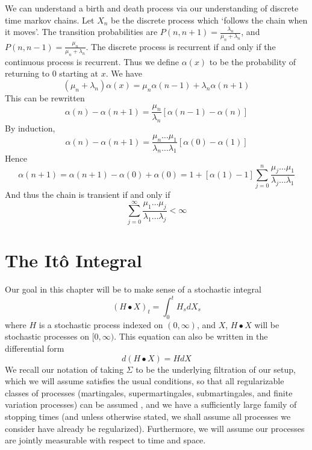 We can understand a birth and death process via our understanding of discrete time markov chains. Let $X_n$ be the discrete process which `follows the chain when it moves'. The transition probabilities are $P(n,n+1) = \frac{\lambda_n}{\mu_n + \lambda_n}$, and $P(n,n-1) = \frac{\mu_n}{\mu_n + \lambda_n}$. The discrete process is recurrent if and only if the continuous process is recurrent. Thus we define $\alpha(x)$ to be the probability of returning to 0 starting at $x$. We have
%
\[ (\mu_n + \lambda_n) \alpha(x) = \mu_n \alpha(n-1) + \lambda_n \alpha(n+1) \]
%
This can be rewritten
%
\[ \alpha(n) - \alpha(n+1) = \frac{\mu_n}{\lambda_n} [\alpha(n-1) - \alpha(n)] \]
%
By induction,
%
\[ \alpha(n) - \alpha(n+1) = \frac{\mu_n \dots \mu_1}{\lambda_n \dots \lambda_1} [\alpha(0) - \alpha(1)] \]
%
Hence
%
\[ \alpha(n+1) = \alpha(n+1) - \alpha(0) + \alpha(0) = 1 + [\alpha(1) - 1] \sum_{j = 0}^n \frac{\mu_j \dots \mu_1}{\lambda_j \dots \lambda_1} \]
%
And thus the chain is transient if and only if
%
\[ \sum_{j = 0}^\infty \frac{\mu_1 \dots \mu_j}{\lambda_1 \dots \lambda_j} < \infty \]




\chapter{The It\^{o} Integral}

Our goal in this chapter will be to make sense of a stochastic integral
%
\[ (H \bullet X)_t = \int_0^t H_s dX_s \]
%
where $H$ is a stochastic process indexed on $(0,\infty)$, and $X$, $H \bullet X$ will be stochastic processes on $[0,\infty)$. This equation can also be written in the differential form
%
\[ d(H \bullet X) = H dX \]
%
We recall our notation of taking $\Sigma$ to be the underlying filtration of our setup, which we will assume satisfies the usual conditions, so that all regularizable classes of processes (martingales, supermartingales, submartingales, and finite variation processes) can be assumed \cadlag, and we have a sufficiently large family of stopping times (and unless otherwise stated, we shall assume all processes we consider have already be regularized). Furthermore, we will assume our processes are jointly measurable with respect to time and space.

